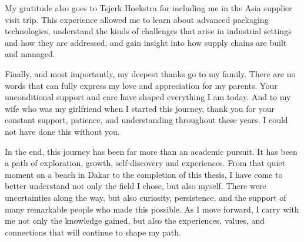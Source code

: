My gratitude also goes to Tsjerk Hoekstra for including me in the Asia supplier visit trip.
This experience allowed me to learn about advanced packaging technologies, understand the kinds of challenges that arise in industrial settings and how they are addressed, and gain insight into how supply chains are built and managed.

Finally, and most importantly, my deepest thanks go to my family.
There are no words that can fully express my love and appreciation for my parents.
Your unconditional support and care have shaped everything I am today.
And to my wife who was my girlfriend when I started this journey, thank you for your constant support, patience, and understanding throughout these years.
I could not have done this without you.

In the end, this journey has been far more than an academic pursuit.
It has been a path of exploration, growth, self-discovery and experiences.
From that quiet moment on a beach in Dakar to the completion of this thesis, I have come to better understand not only the field I chose, but also myself.
There were uncertainties along the way, but also curiosity, persistence, and the support of many remarkable people who made this possible.
As I move forward, I carry with me not only the knowledge gained, but also the experiences, values, and connections that will continue to shape my path.